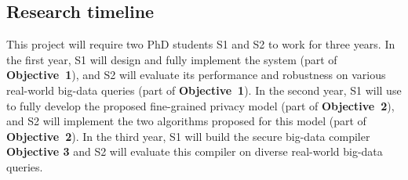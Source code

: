 \vspace{-.15in}\subsection{Research timeline} 
\label{sec:timeline}\vspace{-.075in}

This project will require two PhD students S1 and S2 to work for 
three years. In the first year, S1 will design and fully implement the \kakute 
system (part of \textbf{Objective~1}), and S2 will evaluate its performance 
and robustness on various real-world big-data queries (part of 
\textbf{Objective~1}). In the second year, S1 will 
use \kakute to fully develop the proposed fine-grained privacy model (part of 
\textbf{Objective~2}), and S2 will implement the two algorithms proposed for 
this model (part of \textbf{Objective~2}). In the third year, S1 will build the 
secure big-data compiler \textbf{Objective 3} and S2 will evaluate this 
compiler on diverse real-world big-data queries.



